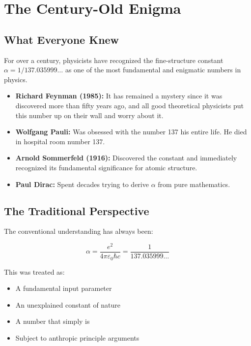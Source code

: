 	\section{The Century-Old Enigma}
	
	\subsection{What Everyone Knew}
	
	For over a century, physicists have recognized the fine-structure constant $\alpha = 1/137.035999\ldots$ as one of the most fundamental and enigmatic numbers in physics.
	
	\begin{tcolorbox}[colback=yellow!5!white,colframe=yellow!75!black,title=Historical Recognition]
		\begin{itemize}
			\item \textbf{Richard Feynman (1985):} It has remained a mystery since it was discovered more than fifty years ago, and all good theoretical physicists put this number up on their wall and worry about it.
			
			\item \textbf{Wolfgang Pauli:} Was obsessed with the number 137 his entire life. He died in hospital room number 137.
			
			\item \textbf{Arnold Sommerfeld (1916):} Discovered the constant and immediately recognized its fundamental significance for atomic structure.
			
			\item \textbf{Paul Dirac:} Spent decades trying to derive $\alpha$ from pure mathematics.
		\end{itemize}
	\end{tcolorbox}
	
	\subsection{The Traditional Perspective}
	
	The conventional understanding has always been:
	
	\begin{equation}
		\alpha = \frac{e^2}{4\pi\varepsilon_0\hbar c} = \frac{1}{137.035999\ldots}
	\end{equation}
	
	This was treated as:
	\begin{itemize}
		\item A fundamental input parameter
		\item An unexplained constant of nature
		\item A number that simply is
		\item Subject to anthropic principle arguments
	\end{itemize}
	

